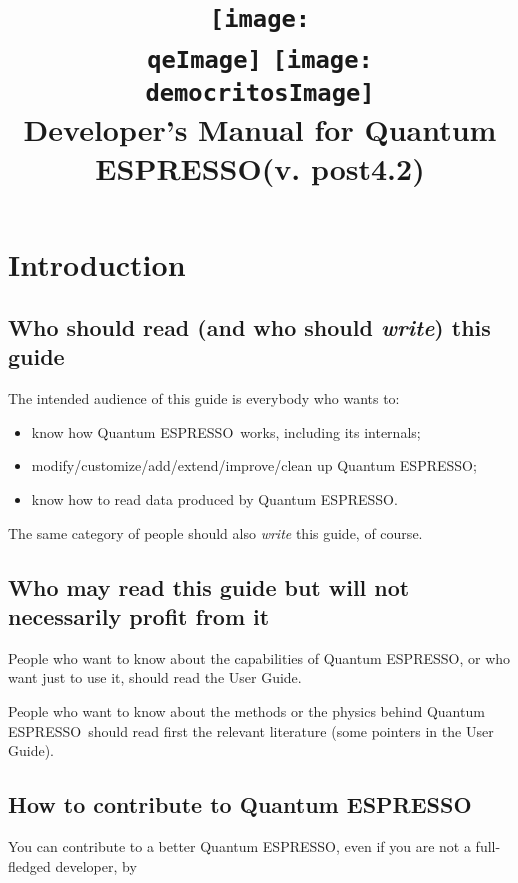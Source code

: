 \documentclass[12pt,a4paper]{article}
\def\version{post4.2}
\def\qe{{\sc Quantum ESPRESSO}}
\def\qeImage{quantum_espresso.pdf}
\def\democritosImage{democritos.pdf}
\def\qeImage{quantum_espresso.png}
\def\democritosImage{democritos.png}
\begin{document}
 
\author{}
\date{}
\title{
  \texttt{[image: \\qeImage]} \hskip 2cm
  \texttt{[image: \\democritosImage]}\\
  \vskip 1cm
  \Huge Developer's Manual for \qe (v. \version) \smallskip
}
\maketitle

\tableofcontents

\section{Introduction}
\subsection{Who should read (and who should {\em write}) this guide}

The intended audience of this guide is everybody who wants to:
\begin{itemize}
\item know how \qe\ works, including its internals;
\item modify/customize/add/extend/improve/clean up \qe;
\item know how to read data produced by \qe.
\end{itemize}
The same category of people should also {\em write} this guide, of course.

\subsection{Who may read this guide but will not necessarily profit from it}

People who want to know about the capabilities of \qe,
or who want just to use it, should read the User Guide.

People who want to know about the methods or the physics
behind \qe\ should read first the relevant  
literature (some pointers in the User Guide).

\subsection{How to contribute to \qe}

You can contribute to a better \qe, even if you are
not a full-fledged developer, by
\end{document}
